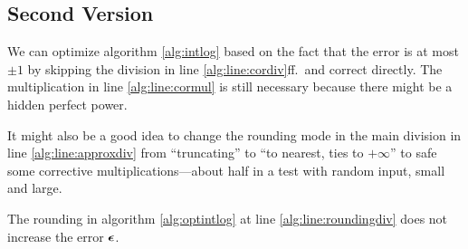 \subsection{Second Version}
We can optimize algorithm \ref{alg:intlog} based on the fact that the error is at most $\pm 1$ by skipping
the division in line \ref{alg:line:cordiv}ff.~and correct directly. The multiplication in line \ref{alg:line:cormul}
is still necessary because there might be a hidden perfect power.

It might also be a good idea to change the rounding mode in the main division in line \ref{alg:line:approxdiv}
from ``truncating'' to ``to nearest, ties to $+\infty$'' to safe some corrective multiplications---about half
in a test with random input, small and large.

\begin{center}
  \begin{algorithmic}[1]
           \label{alg:line:roundingdiv}
           
              
          \EndIf
       \EndIf
       \EndIf
          \Do
          \Else
          \EndIf
       \EndIf
       \EndIf
    \EndFunction
  \end{algorithmic}
\end{center}
\begin{prop}
The rounding in  algorithm \ref{alg:optintlog} at line \ref{alg:line:roundingdiv}
does not increase the error $\boldsymbol{\epsilon}$.
\end{prop}
